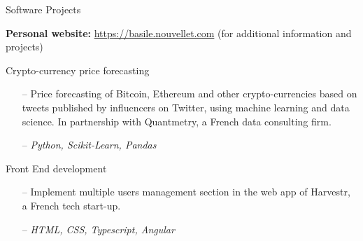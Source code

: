 \documentclass[]{mcdowellcv}
\begin{document}
    \begin{cvsection}{Software Projects}

        \hspace{4pt} \textbf{Personal website:} {\small \color{blue} \url{https://basile.nouvellet.com}} ({\small for additional information and projects})

        \begin{cvsubsection}{Crypto-currency price forecasting}{}{}
            \begin{itemize}
                \item[--] Price forecasting of Bitcoin, Ethereum and other crypto-currencies based on tweets published by influencers on Twitter, using machine learning and data science. In partnership with Quantmetry, a French data consulting firm.
                \item[--] \textit{Python, Scikit-Learn, Pandas}
            \end{itemize}
        \end{cvsubsection}

        \begin{cvsubsection}{Front End development}{}{}
            \begin{itemize}
                \item[--] Implement multiple users management section in the web app of Harvestr, a French tech start-up.
                \item[--] \textit{HTML, CSS, Typescript, Angular}
            \end{itemize}
        \end{cvsubsection}

    \end{cvsection}
\end{document}
